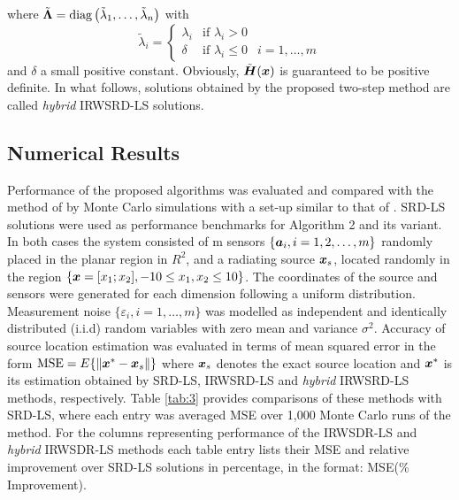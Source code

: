 where $\tilde{\mbox{\boldmath{$\Lambda$}}}=\mbox{diag}\left(\tilde{\lambda}_1,\ldots,\tilde{\lambda}_n\right)$ with
\begin{equation}
\nonumber
\tilde{\lambda}_i=\left\{\begin{array} {lll}
    \lambda_i & \mbox{if } \lambda_i>0 & \\
    \delta &  \mbox{if } \lambda_i\leq0 & i=1,\ldots,m \end{array} \right.
\end{equation}
and $\delta$ a small positive constant. Obviously, $\tilde{\mbox{\boldmath$H$}}(\mbox{\boldmath$x$})$ is guaranteed to be positive definite. In what follows, solutions obtained by the proposed two-step method are called \textit{hybrid} IRWSRD-LS solutions.

\subsection{Numerical Results}

Performance of the proposed algorithms was evaluated and compared with the method of  \cite{BeckStLi} by Monte Carlo simulations with a set-up similar to that of \cite{BeckStLi}. SRD-LS solutions were used as performance benchmarks for Algorithm 2 and its variant. In both cases the system consisted of m sensors $\{\mbox{\boldmath$a$}_i, i=1, 2,\ldots,m\}$ randomly placed in the planar region in $R^2$, and a radiating source $\mbox{\boldmath$x$}_s$, located randomly in the region $\{\mbox{\boldmath$x$}=[x_1;x_2], -10\leq x_1,x_2\leq 10\}$. The coordinates of the source and sensors were generated for each dimension following a uniform distribution. Measurement noise $\{\varepsilon_i, i=1,\ldots,m\}$ was modelled as independent and identically distributed (i.i.d) random variables with zero mean and variance $\sigma^2$. Accuracy of source location estimation was evaluated in terms of mean squared error in the form $\mbox{MSE} = E\{\|\mbox{\boldmath$x$}^*-\mbox{\boldmath$x$}_s\|\}$ where $\mbox{\boldmath$x$}_s$ denotes the exact source location and $\mbox{\boldmath$x$}^*$ is its estimation obtained by SRD-LS, IRWSRD-LS and \textit{hybrid} IRWSRD-LS methods, respectively. Table \ref{tab:3} provides comparisons of these methods with SRD-LS, where each entry was averaged MSE over 1,000 Monte Carlo runs of the method. For the columns representing performance of the IRWSDR-LS and \textit{hybrid} IRWSDR-LS methods each table entry lists their MSE and relative improvement over SRD-LS solutions in percentage, in the format: MSE($\%$ Improvement).

